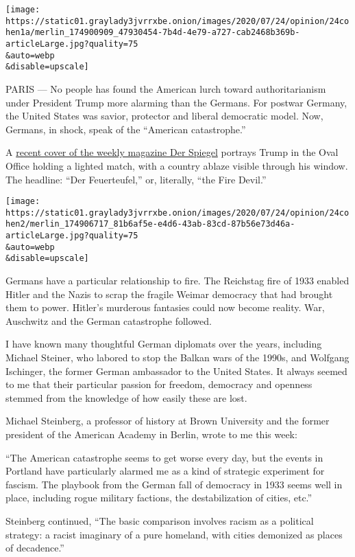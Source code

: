 \texttt{[image: https://static01.graylady3jvrrxbe.onion/images/2020/07/24/opinion/24cohen1a/merlin\_174900909\_47930454-7b4d-4e79-a727-cab2468b369b-articleLarge.jpg?quality=75\\\&auto=webp\\\&disable=upscale]}

PARIS --- No people has found the American lurch toward authoritarianism
under President Trump more alarming than the Germans. For postwar
Germany, the United States was savior, protector and liberal democratic
model. Now, Germans, in shock, speak of the ``American catastrophe.''

A
\href{https://adage.com/article/media/germanys-leading-newsweekly-decries-trumps-incendiary-approach/2261056}{recent
cover of the weekly magazine Der Spiegel} portrays Trump in the Oval
Office holding a lighted match, with a country ablaze visible through
his window. The headline: ``Der Feuerteufel,'' or, literally, ``the Fire
Devil.''

\texttt{[image: https://static01.graylady3jvrrxbe.onion/images/2020/07/24/opinion/24cohen2/merlin\_174906717\_81b6af5e-e4d6-43ab-83cd-87b56e73d46a-articleLarge.jpg?quality=75\\\&auto=webp\\\&disable=upscale]}

Germans have a particular relationship to fire. The Reichstag fire of
1933 enabled Hitler and the Nazis to scrap the fragile Weimar democracy
that had brought them to power. Hitler's murderous fantasies could now
become reality. War, Auschwitz and the German catastrophe followed.

I have known many thoughtful German diplomats over the years, including
Michael Steiner, who labored to stop the Balkan wars of the 1990s, and
Wolfgang Ischinger, the former German ambassador to the United States.
It always seemed to me that their particular passion for freedom,
democracy and openness stemmed from the knowledge of how easily these
are lost.

Michael Steinberg, a professor of history at Brown University and the
former president of the American Academy in Berlin, wrote to me this
week:

``The American catastrophe seems to get worse every day, but the events
in Portland have particularly alarmed me as a kind of strategic
experiment for fascism. The playbook from the German fall of democracy
in 1933 seems well in place, including rogue military factions, the
destabilization of cities, etc.''

Steinberg continued, ``The basic comparison involves racism as a
political strategy: a racist imaginary of a pure homeland, with cities
demonized as places of decadence.''

